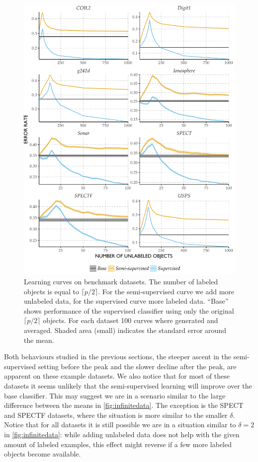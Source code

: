 \documentclass[twoside]{memoir}\usepackage[]{graphicx}\usepackage{xcolor}
\makeatletter
\def\maxwidth{ %
  \ifdim\Gin@nat@width>\linewidth
    \linewidth
  \else
    \Gin@nat@width
  \fi
}
\newenvironment{knitrout}{}{} %
\makeatother
\begin{document}
\begin{knitrout}
\color{fgcolor}\begin{figure}
\includegraphics[width=\maxwidth]{figure/benchmark-1} \caption[Learning curves on benchmark datasets]{Learning curves on benchmark datasets. The number of labeled objects is equal to $\lceil p/2 \rceil$. For the semi-supervised curve we add more unlabeled data, for the supervised curve more labeled data. ``Base'' shows performance of the supervised classifier using only the original $\lceil p/2 \rceil$ objects. For each dataset 100 curves where generated and averaged. Shaded area (small) indicates the standard error around the mean.}\label{fig:benchmark}
\end{figure}


\end{knitrout}

Both behaviours studied in the previous sections, the steeper ascent in the semi-supervised setting before the peak and the slower decline after the peak, are apparent on these example datasets. We also notice that for most of these datasets it seems unlikely that the semi-supervised learning will improve over the base classifier. This may suggest we are in a scenario similar to the large difference between the means in \cref{fig:infinitedata}. The exception is the SPECT and SPECTF datasets, where the situation is more similar to the smaller $\delta$. Notice that for all datasets it is still possible we are in a situation similar to $\delta=2$ in \cref{fig:infinitedata}: while adding unlabeled data does not help with the given amount of labeled examples, this effect might reverse if a few more labeled objects become available.
\end{document}
